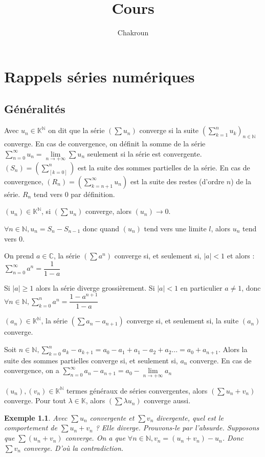 \documentclass[a4paper,12pt]{book}
\title{Cours}
\author{Chakroun}
\newcommand{\Def}[2]{\begin{tcolorbox}[sharp corners, colback=white,colframe=blue!90!black!75, title=Définition : #1]#2\end{tcolorbox}}
\newcommand{\Thr}[2]{\begin{tcolorbox}[sharp corners, colback=white,colframe=red!90!black!75, title=Théorème : #1]#2\end{tcolorbox}}
\newcommand{\Prop}[2]{\begin{tcolorbox}[sharp corners, colback=white,colframe=red!90!black!75, title=Proposition : #1]#2\end{tcolorbox}}
\newcommand{\Pre}[1]{\begin{tcolorbox}[sharp corners, colback=white,colframe=green!60!green!30!black!75, title=Preuve]#1\end{tcolorbox}}
\newtheorem{Exe}{Exemple}[section]
\def\C{\mathbb{C}}
\def\N{\mathbb{N}}
\def\K{\mathbb{K}}
\begin{document}
\tableofcontents
\chapter{Rappels séries numériques}
\section{Généralités}
\Def{Convergence série}{Avec $u_n\in\K^\N$ on dit que la série $(\sum u_n)$ converge si la suite $(\sum\limits_{k=1}^n u_k)_{n\in\N}$ converge. En cas de convergence, on définit la somme de la série $\sum_{n = 0}^{\infty} u_n = \lim\limits_{n\to+\infty} \sum u_n$ seulement si la série est convergente. $(S_n) = \left(\sum\limits_[k=0]^n\right)$ est la suite des sommes partielles de la série. En cas de convergence, $(R_n) =\left(\sum_{k = n+1}^{\infty} u_n\right)$ est la suite des restes (d'ordre $n$) de la série. $R_n$ tend vers 0 par définition.}
\Thr{de divergence grossière}{$(u_n)\in\K^\N$, si $(\sum u_n)$ converge, alors $(u_n)\to0$.}
\Pre{$\forall n\in\N, u_n = S_n-S_{n-1}$ donc quand $(u_n)$ tend vers une limite $l$, alors $u_n$ tend vers 0.}
\Thr{Séries géométriques}{On prend $a\in\C$, la série $(\sum a^n)$ converge si, et seulement si, $\vert a\vert<1$ et alors : $\sum_{n = 0}^{\infty} a^n = \dfrac{1}{1-a}$}
\Pre{Si $\vert a\vert\geq 1$ alors la série diverge grossièrement. Si $\vert a\vert<1$ en particulier $a\neq1$, donc $\forall n\in\N,\sum\limits_{k=0}^n a^n =\dfrac{1-a^{n+1}}{1-a}$}
\Thr{Dominos ou série téléscopique}{$(a_n)\in\K^\N$, la série $(\sum a_n - a_{n+1})$ converge si, et seulement si, la suite $(a_n)$ converge.}
\Pre{Soit $n\in\N, \sum\limits_{k=0}^n a_k - a_{k+1} = a_0 -a_1 + a_1 -a_2+a_2... = a_0+a_{n+1}$. Alors la suite des sommes partielles converge si, et seulement si, $a_n$ converge. En cas de convergence, on a $\sum_{n = 0}^{\infty} a_n - a_{n+1} = a_0 - \lim\limits_{n\to+\infty}a_n$}
\Prop{Opérations sur les séries convergentes}{$(u_n),(v_n)\in\K^\N$ termes généraux de séries convergentes, alors $(\sum u_n + v_n)$ converge. Pour tout $\lambda\in\K$, alors $(\sum \lambda u_n)$ converge aussi.}
\begin{Exe}
Avec $\sum u_n$ convergente et $\sum v_n$ divergente, quel est le comportement de $\sum u_n + v_n$ ? Elle diverge. Prouvons-le par l'absurde. Supposons que $\sum (u_n +v_n)$ converge. On a que $\forall n\in\N, v_n = (u_n + v_n) - u_n$. Donc $\sum v_n$ converge. D'où la contradiction.
\end{Exe}
\end{document}
